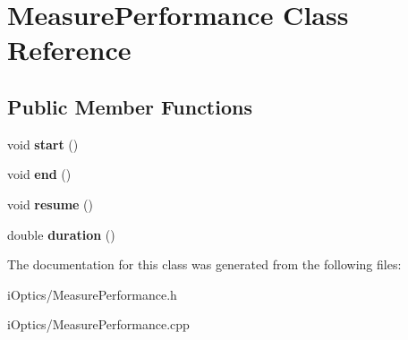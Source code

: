 \hypertarget{class_measure_performance}{}\section{Measure\+Performance Class Reference}
\label{class_measure_performance}
\subsection*{Public Member Functions}
\begin{DoxyCompactItemize}
\item 
\mbox{\label{class_measure_performance_ad96801923dd8aa96e23077ae83f33a33}} 
void {\bfseries start} ()
\item 
\mbox{\label{class_measure_performance_abf56a715d5664ea3337d2a7271c3f061}} 
void {\bfseries end} ()
\item 
\mbox{\label{class_measure_performance_af26500cfebbec5fd006be3c5089100c4}} 
void {\bfseries resume} ()
\item 
\mbox{\label{class_measure_performance_aa3b5b93a1b5faeb7d0a6533cd964bfd7}} 
double {\bfseries duration} ()
\end{DoxyCompactItemize}


The documentation for this class was generated from the following files\+:\begin{DoxyCompactItemize}
\item 
i\+Optics/Measure\+Performance.\+h\item 
i\+Optics/Measure\+Performance.\+cpp\end{DoxyCompactItemize}
